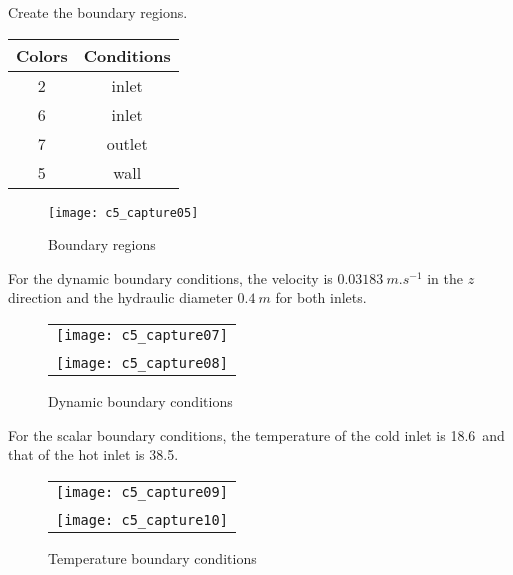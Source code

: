 \newpage
Create the boundary regions.

\begin{center}
\begin{tabular}{|c|c|}
\hline
Colors & Conditions \\
\hline
2 & inlet \\
\hline
6 & inlet \\
\hline
7 & outlet \\
\hline
5 & wall \\
\hline
\end{tabular}
\end{center}

\begin{figure}[h!]
\begin{center}
\texttt{[image: c5\_capture05]}
\caption{Boundary regions}
\label{fig5_e5}
\end{center}
\end{figure}


\newpage
For the dynamic boundary conditions, the velocity is $0.03183\ m.s^{-1}$ in the
$z$ direction and the hydraulic diameter $0.4\ m$ for both inlets.


\begin{figure}[h!]
\begin{center}
\begin{tabular}{c}
\texttt{[image: c5\_capture07]} \\
\\
\texttt{[image: c5\_capture08]}
\end{tabular}
\caption{Dynamic boundary conditions}
\label{fig6_e5}
\end{center}
\end{figure}


\newpage
For the scalar boundary conditions, the temperature of the cold inlet is
18.6\degresC\ and that of the hot inlet is 38.5\degresC.

\begin{figure}[h!]
\begin{center}
\begin{tabular}{c}
\texttt{[image: c5\_capture09]} \\
\\
\texttt{[image: c5\_capture10]}
\end{tabular}
\caption{Temperature boundary conditions}
\label{fig8_e5}
\end{center}
\end{figure}


